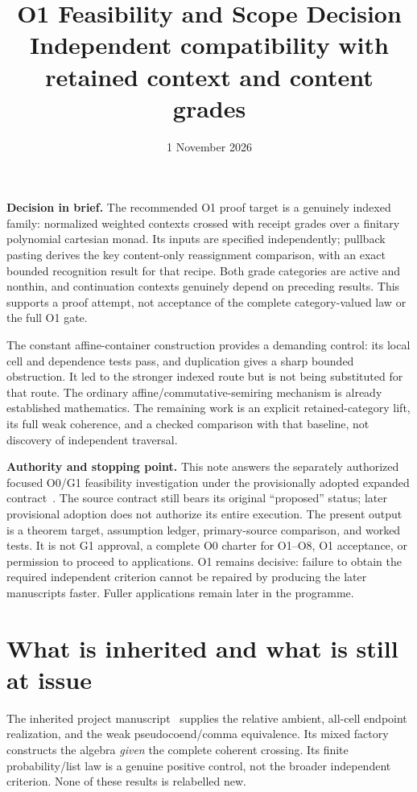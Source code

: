 \documentclass[11pt,a4paper]{article}
\title{O1 Feasibility and Scope Decision\\[5pt]
\large Independent compatibility with retained context and content grades}
\author{}
\date{1 November 2026}
\newcommand{\status}[1]{\textbf{#1.}}
\begin{document}
\maketitle
\vspace{-1em}

\status{Decision in brief}
The recommended O1 proof target is a genuinely indexed family: normalized
weighted contexts crossed with receipt grades over a finitary polynomial
cartesian monad. Its inputs are specified independently; pullback pasting
derives the key content-only reassignment comparison, with an exact bounded
recognition result for that recipe. Both grade categories are active and
nonthin, and continuation contexts genuinely depend on preceding results.
This supports a proof attempt, not acceptance of the complete
category-valued law or the full O1 gate.

The constant affine-container construction provides a demanding control:
its local cell and dependence tests pass, and duplication gives a sharp
bounded obstruction. It led to the stronger indexed route but is not being
substituted for that route. The ordinary affine/commutative-semiring mechanism
is already established mathematics. The remaining work is an explicit
retained-category lift, its full weak coherence, and a checked comparison
with that baseline, not discovery of independent traversal.

\status{Authority and stopping point}
This note answers the separately authorized focused O0/G1 feasibility
investigation under the provisionally adopted expanded contract~\cite{Contract}.
The source contract still bears its original ``proposed'' status; later
provisional adoption does not authorize its entire execution. The present
output is a theorem target, assumption ledger, primary-source comparison,
and worked tests. It is not G1 approval, a complete O0 charter for O1--O8,
O1 acceptance, or permission to proceed to applications. O1 remains decisive:
failure to obtain the required independent criterion cannot be repaired by
producing the later manuscripts faster. Fuller applications remain later
in the programme.

\section{What is inherited and what is still at issue}

The inherited project manuscript~\cite{Unified} supplies the relative ambient,
all-cell endpoint realization, and the weak pseudocoend/comma equivalence.
Its mixed factory constructs the algebra \emph{given} the complete coherent
crossing. Its finite probability/list law is a genuine positive control, not
the broader independent criterion. None of these results is relabelled new.
\end{document}
